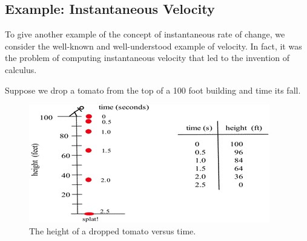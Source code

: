 \subsection{Example: Instantaneous Velocity} 
To give another example of the concept of instantaneous rate of change, we consider the well-known and well-understood example of velocity. In fact, it was the problem of computing instantaneous velocity that led to the invention of calculus.

Suppose we drop a tomato from the top of a 100 foot building and time its fall.
\begin{figure}
  \vspace{  0pt}
    \centering
    \includegraphics{img/chap2/image003.png}
    \caption{The height of a dropped tomato versus time.}
\label{fig:2-2-tomato}
\end{figure}


